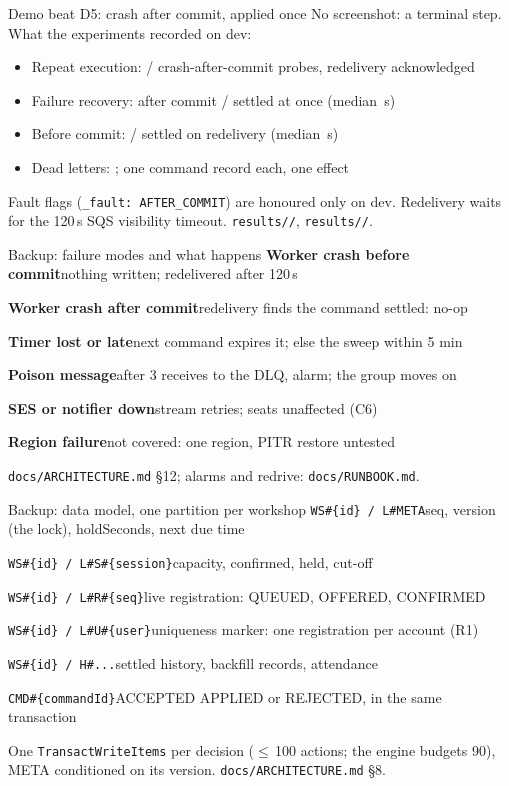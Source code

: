 \documentclass[t,20pt]{beamer}
\newcommand{\code}[1]{\texttt{#1}}
\newcommand{\srspeaker}{}
\newcommand{\speaker}[1]{\renewcommand{\srspeaker}{#1}}
\newcommand{\source}[1]{\par\vfill{\fontsize{13}{15}\selectfont\color{srMuted}#1\par}\vspace{0.06in}}
\newcommand{\fm}[2]{\textbf{#1}\enspace\textrightarrow\enspace #2\par\vspace{0.12in}}
\newcommand{\key}[2]{\code{#1}\enspace\textrightarrow\enspace #2\par\vspace{0.12in}}
\begin{document}
\begin{frame}{Demo beat D5: crash after commit, applied once}
  \vspace{0.06in}
  No screenshot: a terminal step. What the experiments recorded on dev:\par\vspace{0.20in}
  \begin{itemize}
    \setlength{\itemsep}{0.40em}
    \item Repeat execution: \RepeatAfterCommitPassed/\RepeatAfterCommitCases{} crash-after-commit probes, redelivery acknowledged
    \item Failure recovery: after commit \FailureAfterCommitPassed/\FailureAfterCommitCases{} settled at once (median \FailureAfterCommitSettleMedianS\,s)
    \item Before commit: \FailureBeforeCommitPassed/\FailureBeforeCommitCases{} settled on redelivery (median \FailureBeforeCommitSettleMedianS\,s)
    \item Dead letters: \FailureDeadLetters; one command record each, one effect
  \end{itemize}
  \source{Fault flags (\code{\_fault: AFTER\_COMMIT}) are honoured only on dev. Redelivery waits for the
    120\,s SQS visibility timeout. \code{results/\RepeatDir/}, \code{results/\FailureDir/}.}
\end{frame}

\speaker{LIN JIE}
\begin{frame}{Backup: failure modes and what happens}
  \vspace{0.06in}
  \fm{Worker crash before commit}{nothing written; redelivered after 120\,s}
  \fm{Worker crash after commit}{redelivery finds the command settled: no-op}
  \fm{Timer lost or late}{next command expires it; else the sweep within 5 min}
  \fm{Poison message}{after 3 receives to the DLQ, alarm; the group moves on}
  \fm{SES or notifier down}{stream retries; seats unaffected (C6)}
  \fm{Region failure}{not covered: one region, PITR restore untested}
  \source{\code{docs/ARCHITECTURE.md} \S12; alarms and redrive: \code{docs/RUNBOOK.md}.}
\end{frame}

\begin{frame}{Backup: data model, one partition per workshop}
  \vspace{0.06in}
  \key{WS\#\{id\} / L\#META}{seq, version (the lock), holdSeconds, next due time}
  \key{WS\#\{id\} / L\#S\#\{session\}}{capacity, confirmed, held, cut-off}
  \key{WS\#\{id\} / L\#R\#\{seq\}}{live registration: QUEUED, OFFERED, CONFIRMED}
  \key{WS\#\{id\} / L\#U\#\{user\}}{uniqueness marker: one registration per account (R1)}
  \key{WS\#\{id\} / H\#...}{settled history, backfill records, attendance}
  \key{CMD\#\{commandId\}}{ACCEPTED \textrightarrow{} APPLIED or REJECTED, in the same transaction}
  \source{One \code{TransactWriteItems} per decision ($\leq$\,100 actions; the engine budgets 90), META
    conditioned on its version. \code{docs/ARCHITECTURE.md} \S8.}
\end{frame}
\end{document}
